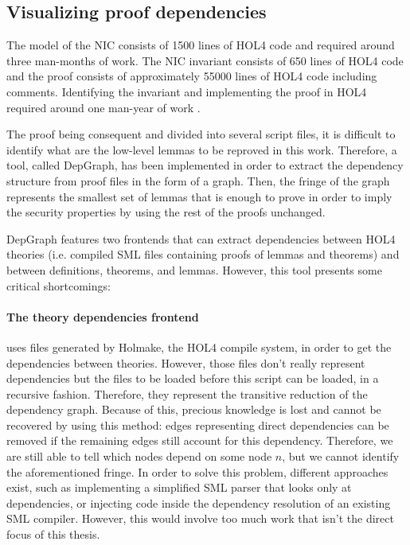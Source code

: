 \documentclass[10pt,a4paper]{article}
\begin{document}
\begin{multicols}{2}
\subsection{Visualizing proof dependencies}

The model of the NIC consists of \num{1500} lines of HOL4 code and required around three man-months of work. The NIC invariant consists of \num{650} lines of HOL4 code and the proof consists of approximately \num{55000} lines of HOL4 code including comments. Identifying the invariant and implementing the proof in HOL4 required around one man-year of work \cite{haglund_trustworthy_nodate}.

The proof being consequent and divided into several script files, it is difficult to identify what are the low-level lemmas to be reproved in this work. Therefore, a tool, called DepGraph, has been implemented in order to extract the dependency structure from proof files in the form of a graph. Then, the fringe of the graph represents the smallest set of lemmas that is enough to prove in order to imply the security properties by using the rest of the proofs unchanged.

DepGraph features two frontends that can extract dependencies between HOL4 theories (i.e. compiled {SML} files containing proofs of lemmas and theorems) and between definitions, theorems, and lemmas. However, this tool presents some critical shortcomings:

\paragraph{The theory dependencies frontend} uses files generated by Holmake, the HOL4 compile system, in order to get the dependencies between theories. However, those files don't really represent dependencies but the files to be loaded before this script can be loaded, in a recursive fashion. Therefore, they represent the transitive reduction of the dependency graph. Because of this, precious knowledge is lost and cannot be recovered by using this method: edges representing direct dependencies can be removed if the remaining edges still account for this dependency. Therefore, we are still able to tell which nodes depend on some node $n$, but we cannot identify the aforementioned fringe. In order to solve this problem, different approaches exist, such as implementing a simplified SML parser that looks only at dependencies, or injecting code inside the dependency resolution of an existing SML compiler. However, this would involve too much work that isn't the direct focus of this thesis.


\end{multicols}
\end{document}
